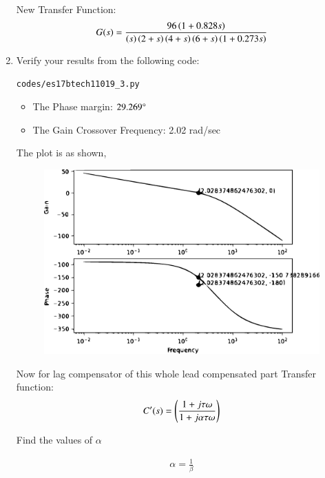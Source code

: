 \begin{enumerate}[label=\thesection.\arabic*.,ref=\thesection.\theenumi]
New Transfer Function:
\begin{align}
G(s)=\frac{96\left(1+ 0.828s\right)}{\left(s\right)\left(2+s\right)\left(4+s\right)\left(6+s\right)\left(1+0.273s\right)}
\end{align}




\item
Verify your results from the following code:
\begin{lstlisting}
codes/es17btech11019_3.py
\end{lstlisting}
\begin{itemize}
    \item The Phase margin: $29.269\degree$
    \item The Gain Crossover Frequency: 2.02 rad/sec
\end{itemize}
%
The plot is as shown,
\begin{figure}[!ht]
  \centering
  \includegraphics[width=\columnwidth]{./figs/es17btech11019_2.eps}
  \caption{}
  \label{fig:es17btech11019_2}
\end{figure}

Now for lag compensator of this whole lead compensated part
Transfer function:
\begin{align}
C'(s)=\left(\frac{1+j\tau\omega}{1+j\alpha\tau\omega}\right)
\label{eq:es17btech11019_lag_compensator}
\end{align}

Find the values of $\alpha$ \\
\solution 

\begin{align}
\alpha=\frac{1}{\beta}
\label{eq:es17btech11019_alpha}
\end{align}


\end{enumerate}
